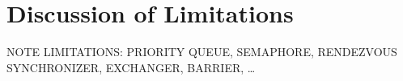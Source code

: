 \section{Discussion of Limitations}
\label{sec:discussion}

NOTE LIMITATIONS: PRIORITY QUEUE, SEMAPHORE, RENDEZVOUS SYNCHRONIZER,
EXCHANGER, BARRIER, …

